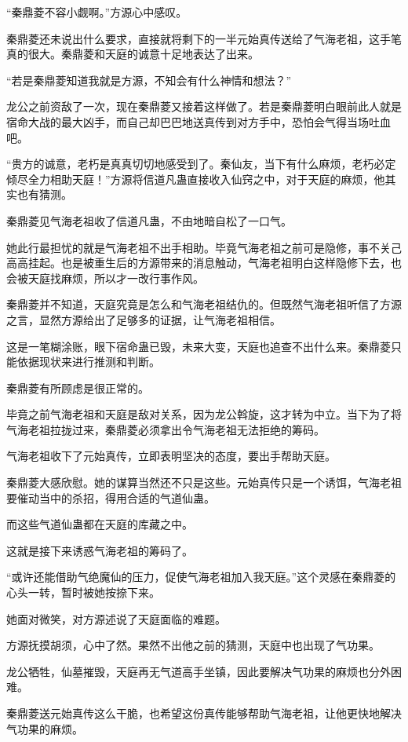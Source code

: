 \begin{this_body}
“秦鼎菱不容小觑啊。”方源心中感叹。

秦鼎菱还未说出什么要求，直接就将剩下的一半元始真传送给了气海老祖，这手笔真的很大。秦鼎菱和天庭的诚意十足地表达了出来。

“若是秦鼎菱知道我就是方源，不知会有什么神情和想法？”

龙公之前资敌了一次，现在秦鼎菱又接着这样做了。若是秦鼎菱明白眼前此人就是宿命大战的最大凶手，而自己却巴巴地送真传到对方手中，恐怕会气得当场吐血吧。

“贵方的诚意，老朽是真真切切地感受到了。秦仙友，当下有什么麻烦，老朽必定倾尽全力相助天庭！”方源将信道凡蛊直接收入仙窍之中，对于天庭的麻烦，他其实也有猜测。

秦鼎菱见气海老祖收了信道凡蛊，不由地暗自松了一口气。

她此行最担忧的就是气海老祖不出手相助。毕竟气海老祖之前可是隐修，事不关己高高挂起。也是被重生后的方源带来的消息触动，气海老祖明白这样隐修下去，也会被天庭找麻烦，所以才一改行事作风。

秦鼎菱并不知道，天庭究竟是怎么和气海老祖结仇的。但既然气海老祖听信了方源之言，显然方源给出了足够多的证据，让气海老祖相信。

这是一笔糊涂账，眼下宿命蛊已毁，未来大变，天庭也追查不出什么来。秦鼎菱只能依据现状来进行推测和判断。

秦鼎菱有所顾虑是很正常的。

毕竟之前气海老祖和天庭是敌对关系，因为龙公斡旋，这才转为中立。当下为了将气海老祖拉拢过来，秦鼎菱必须拿出令气海老祖无法拒绝的筹码。

气海老祖收下了元始真传，立即表明坚决的态度，要出手帮助天庭。

秦鼎菱大感欣慰。她的谋算当然还不只是这些。元始真传只是一个诱饵，气海老祖要催动当中的杀招，得用合适的气道仙蛊。

而这些气道仙蛊都在天庭的库藏之中。

这就是接下来诱惑气海老祖的筹码了。

“或许还能借助气绝魔仙的压力，促使气海老祖加入我天庭。”这个灵感在秦鼎菱的心头一转，暂时被她按捺下来。

她面对微笑，对方源述说了天庭面临的难题。

方源抚摸胡须，心中了然。果然不出他之前的猜测，天庭中也出现了气功果。

龙公牺牲，仙墓摧毁，天庭再无气道高手坐镇，因此要解决气功果的麻烦也分外困难。

秦鼎菱送元始真传这么干脆，也希望这份真传能够帮助气海老祖，让他更快地解决气功果的麻烦。


\end{this_body}
